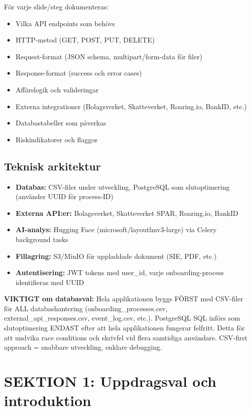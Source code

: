 \documentclass[12pt,a4paper]{article}
\begin{document}
För varje slide/steg dokumenteras:
\begin{itemize}[noitemsep]
  \item Vilka API endpoints som behövs
  \item HTTP-metod (GET, POST, PUT, DELETE)
  \item Request-format (JSON schema, multipart/form-data för filer)
  \item Response-format (success och error cases)
  \item Affärslogik och valideringar
  \item Externa integrationer (Bolagsverket, Skatteverket, Roaring.io, BankID, etc.)
  \item Databastabeller som påverkas
  \item Riskindikatorer och flaggor
\end{itemize}

\subsection{Teknisk arkitektur}

\begin{itemize}[noitemsep]
  \item \textbf{Databas:} CSV-filer under utveckling, PostgreSQL som slutoptimering (använder UUID för process-ID)
  \item \textbf{Externa API:er:} Bolagsverket, Skatteverket SPAR, Roaring.io, BankID
  \item \textbf{AI-analys:} Hugging Face (microsoft/layoutlmv3-large) via Celery background tasks
  \item \textbf{Fillagring:} S3/MinIO för uppladdade dokument (SIE, PDF, etc.)
  \item \textbf{Autentisering:} JWT tokens med user\_id, varje onboarding-process identifieras med UUID
\end{itemize}

\textbf{VIKTIGT om databasval:} Hela applikationen byggs FÖRST med CSV-filer för ALL databashantering (onboarding\_processes.csv, external\_api\_responses.csv, event\_log.csv, etc.). PostgreSQL SQL införs som slutoptimering ENDAST efter att hela applikationen fungerar felfritt. Detta för att undvika race conditions och skrivfel vid flera samtidiga användare. CSV-first approach = snabbare utveckling, enklare debugging.

\newpage

\section{SEKTION 1: Uppdragsval och introduktion}
\end{document}

